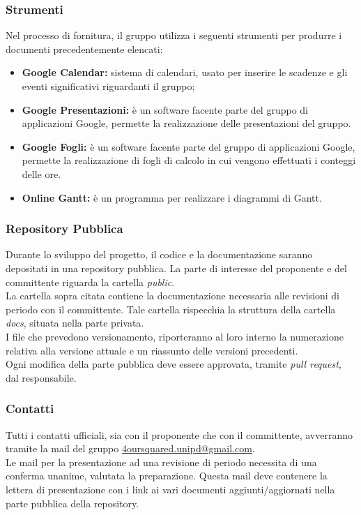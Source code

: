 \documentclass[a4paper, 12pt]{article}
\begin{document}
\subsubsection{Strumenti}
Nel processo di fornitura, il gruppo utilizza i seguenti strumenti per produrre
i documenti precedentemente elencati:
\begin{itemize}
    \item \textbf{Google Calendar:} sistema di calendari, usato per inserire le
    scadenze e gli eventi significativi riguardanti il gruppo;
    \item \textbf{Google Presentazioni:} è un
    software facente parte del gruppo di applicazioni Google, permette la
    realizzazione delle presentazioni del gruppo.
    \item \textbf{Google Fogli:} è un software facente parte del gruppo di
    applicazioni Google, permette la realizzazione di fogli di calcolo in cui
    vengono effettuati i conteggi delle ore. 
    \item \textbf{Online Gantt:} è un programma per realizzare i diagrammi di
    Gantt.
\end{itemize}

\subsubsection{Repository Pubblica}
Durante lo sviluppo del progetto, il codice e la documentazione saranno depositati in una repository pubblica. La parte di interesse del proponente e del committente riguarda la cartella \textit{public}. \\
La cartella sopra citata contiene la documentazione necessaria alle revisioni di periodo con il committente. Tale cartella rispecchia la struttura della cartella \textit{docs}, situata nella parte privata. \\
I file che prevedono versionamento, riporteranno al loro interno la numerazione relativa alla versione attuale e un riassunto delle versioni precedenti. \\ 
Ogni modifica della parte pubblica deve essere approvata, tramite \textit{pull request}, dal responsabile.

\subsubsection{Contatti}
Tutti i contatti ufficiali, sia con il proponente che con il committente, avverranno tramite la mail del gruppo \href{mailto:4oursquared.unipd@gmail.com}{4oursquared.unipd@gmail.com}.\\
Le mail per la presentazione ad una revisione di periodo necessita di una conferma unanime, valutata la preparazione. Questa mail deve contenere la lettera di presentazione con i link ai vari documenti aggiunti/aggiornati nella parte pubblica della repository.
\end{document}
